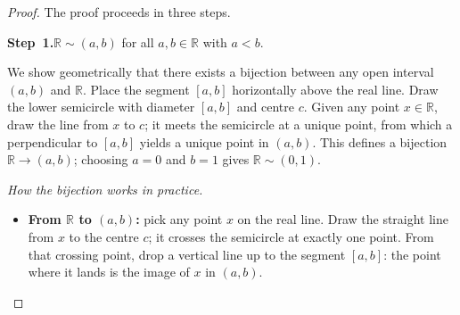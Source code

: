 \documentclass[12pt]{article}
\theoremstyle{definition}
\theoremstyle{plain}
\theoremstyle{remark}
\newcommand{\R}{\mathbb{R}}
\begin{document}
\begin{proof}
The proof proceeds in three steps.

\medskip
\noindent\textbf{Step~1.}\quad $\R \sim (a,b)$ for all $a,b\in\R$ with $a<b$.

\smallskip
We show geometrically that there exists a bijection between any open interval
$(a,b)$ and $\R$. Place the segment $[a,b]$ horizontally above the real line.
Draw the lower semicircle with diameter $[a,b]$ and centre $c$. Given any point
$x\in\R$, draw the line from $x$ to $c$; it meets the semicircle at a unique point,
from which a perpendicular to $[a,b]$ yields a unique point in $(a,b)$. This defines
a bijection $\R\to(a,b)$; choosing $a=0$ and $b=1$ gives $\R\sim(0,1)$.

\begin{center}
\end{center}

\smallskip
\noindent\textit{How the bijection works in practice.}
\begin{itemize}[nosep]
    \item \textbf{From $\R$ to $(a,b)$:} pick any point $x$ on the real line.
          Draw the straight line from $x$ to the centre $c$; it crosses the
          semicircle at exactly one point. From that crossing point, drop a
          vertical line up to the segment $[a,b]$: the point where it lands is
          the image of $x$ in $(a,b)$.


\end{itemize}
\end{proof}
\end{document}
